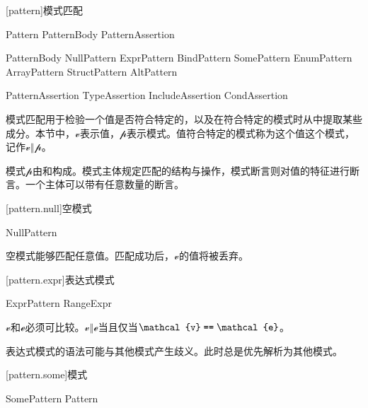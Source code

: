 
[pattern]{模式匹配}

\begin{bnf}{Pattern}
    PatternBody PatternAssertion\bnfs
\end{bnf}

\begin{bnf}{PatternBody}
    NullPattern \br
    ExprPattern \br
    BindPattern \br
    SomePattern \br
    EnumPattern \br
    ArrayPattern \br
    StructPattern \br
    AltPattern
\end{bnf}

\begin{bnf}{PatternAssertion}
    TypeAssertion \br
    IncludeAssertion \br
    CondAssertion
\end{bnf}

\pnum
模式匹配用于检验一个值是否符合特定的，以及在符合特定的模式时从中提取某些成分。本节中，$\mathcal{v}$表示值，$\mathcal{p}$表示模式。值符合特定的模式称为这个值这个模式，记作$\mathcal{v}\mathrel{\Vert}\mathcal{p}$。

\pnum
模式$\mathcal{p}$由和构成。模式主体规定匹配的结构与操作，模式断言则对值的特征进行断言。一个主体可以带有任意数量的断言。

[pattern.null]{空模式}

\begin{bnf}{NullPattern}
    \tcode{_}
\end{bnf}

\pnum
空模式能够匹配任意值。匹配成功后，$\mathcal{v}$的值将被丢弃。

[pattern.expr]{表达式模式}

\begin{bnf}{ExprPattern}
    RangeExpr
\end{bnf}

\pnum
$\mathcal{v}$和$\mathcal{e}$必须可比较。$\mathcal{v}\mathrel{\Vert}\mathcal{e}$当且仅当$\mathcal{v}\mathrel{\tcode{==}}\mathcal{e}$。

\pnum
\enternote 表达式模式的语法可能与其他模式产生歧义。此时总是优先解析为其他模式。 \exitnote

[pattern.some]{模式}

\begin{bnf}{SomePattern}
     Pattern
\end{bnf}

